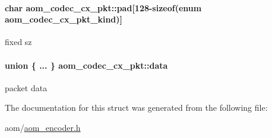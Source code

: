 \paragraph[{\texorpdfstring{pad}{pad}}]{\setlength{\rightskip}{0pt plus 5cm}char aom\+\_\+codec\+\_\+cx\+\_\+pkt\+::pad\mbox{[}128-\/sizeof(enum {\bf aom\+\_\+codec\+\_\+cx\+\_\+pkt\+\_\+kind})\mbox{]}}\hypertarget{structaom__codec__cx__pkt_afe326262723aeb6bcd2eaa32d8d83336}{}\label{structaom__codec__cx__pkt_afe326262723aeb6bcd2eaa32d8d83336}
fixed sz 
\paragraph[{\texorpdfstring{data}{data}}]{\setlength{\rightskip}{0pt plus 5cm}union \{ ... \}   aom\+\_\+codec\+\_\+cx\+\_\+pkt\+::data}\hypertarget{structaom__codec__cx__pkt_afb379cd4bfa7692d1d6e85f4e4b2b410}{}\label{structaom__codec__cx__pkt_afb379cd4bfa7692d1d6e85f4e4b2b410}
packet data 

The documentation for this struct was generated from the following file\+:\begin{DoxyCompactItemize}
\item 
aom/\hyperlink{aom__encoder_8h}{aom\+\_\+encoder.\+h}\end{DoxyCompactItemize}
